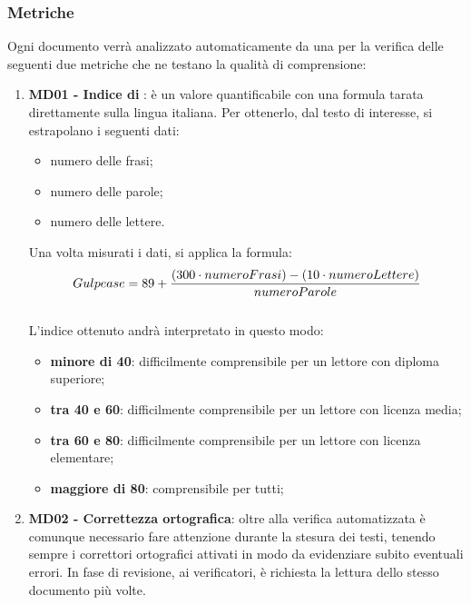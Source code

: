 	\subsubsection{Metriche}
	Ogni documento verrà analizzato automaticamente da una  per la verifica delle seguenti due metriche che ne testano la qualità di comprensione:
	\begin{enumerate}
		\item \textbf{MD01 - Indice di }: è un valore quantificabile con una formula tarata direttamente sulla lingua italiana. Per ottenerlo, dal testo di interesse, si estrapolano i seguenti dati:
		\begin{itemize}
			\item numero delle frasi;
			\item numero delle parole;
			\item numero delle lettere.
		\end{itemize}
		Una volta misurati i dati, si applica la formula:
		\begin{equation}\label{Formula per il calcolo dell'indice di Gulpease}
		Gulpease = 89 + {{(300 \cdot numeroFrasi)} - {(10 \cdot numeroLettere)} \over {numeroParole}}
		\end{equation}
		\\L'indice ottenuto andrà interpretato in questo modo:
		\begin{itemize}
			\item \textbf{minore di 40}: difficilmente comprensibile per un lettore con diploma superiore; 
			\item \textbf{tra 40 e 60}: difficilmente comprensibile per un lettore con licenza media;
			\item \textbf{tra 60 e 80}: difficilmente comprensibile per un lettore con licenza elementare;
			\item \textbf{maggiore di 80}: comprensibile per tutti;
		\end{itemize}
		\item \textbf{MD02 - Correttezza ortografica}: oltre alla verifica automatizzata è comunque necessario fare attenzione durante la stesura dei testi, tenendo sempre i correttori ortografici attivati in modo da evidenziare subito eventuali errori. In fase di revisione, ai verificatori, è richiesta la lettura dello stesso documento più volte.
	\end{enumerate}